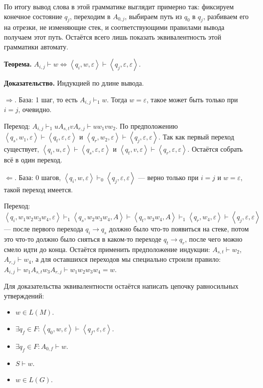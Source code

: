 По итогу вывод слова в этой грамматике выглядит примерно так: фиксируем конечное состояние $q_j$, переходим в $A_{0,j}$, выбираем путь из $q_0$ в $q_j$, разбиваем его на отрезки, не изменяющие стек, и соответствующими правилами вывода получаем этот путь.
Остаётся всего лишь показать эквивалентность этой грамматики автомату.

\textbf{Теорема.} $A_{i,j} \vdash w \iff \left<q_i, w, \varepsilon \right> \vdash \left<q_j, \varepsilon, \varepsilon \right>$.

\textbf{Доказательство.} Индукцией по длине вывода. 

$\Rightarrow$. База: 1 шаг, то есть $A_{i,j} \vdash_1 w$.
Тогда $w = \varepsilon$, такое может быть только при $i = j$, очевидно.

Переход: $A_{i,j} \vdash_1 uA_{s,t} v A_{r,j} \vdash u w_1 v w_2$.
По предположению $\left<q_s, w_1, \varepsilon \right> \vdash \left<q_t, \varepsilon, \varepsilon \right>$ и $\left<q_r, w_2, \varepsilon \right> \vdash \left<q_j, \varepsilon, \varepsilon \right>$.
Так как первый переход существует, $\left<q_i, u, \varepsilon \right> \vdash \left<q_s, \varepsilon, \varepsilon \right>$ и $\left<q_t, v, \varepsilon \right> \vdash \left<q_r, \varepsilon, \varepsilon \right>$.
Остаётся собрать всё в один переход.

$\Leftarrow$. База: 0 шагов, $\left<q_i, w, \varepsilon \right> \vdash_0 \left<q_j, \varepsilon, \varepsilon \right>$ --- верно только при $i = j$ и $w = \varepsilon$, такой переход имеется.

Переход: $\left<q_i, w_1 w_2 w_3 w_4, \varepsilon \right> \vdash_1 \left<q_s, w_2 w_3 w_4, A \right> \vdash \left<q_t, w_3 w_4, A \right> \vdash_1 \left<q_r, w_4, \varepsilon \right> \vdash \left<q_j, \varepsilon, \varepsilon \right>$ --- после первого перехода $q_i \to q_s$ должно было что-то появиться на стеке, потом это что-то должно было сняться в каком-то переходе $q_t \to q_r$, после чего можно смело идти до конца.
Остаётся применить предположение индукции: $A_{s,t} \vdash w_2$, $A_{r, j} \vdash w_4$, а для оставшихся переходов мы специально строили правило: $A_{i,j} \vdash w_1 A_{s,t} w_3 A_{r,j} \vdash w_1 w_2 w_3 w_4 = w$.

\QED

Для доказательства эквивалентности остаётся написать цепочку равносильных утверждений:
\begin{itemize}
    \item $w \in L(M)$.
    \item $\exists q_f \in F: \left<q_0, w, \varepsilon \right> \vdash \left<q_f, \varepsilon, \varepsilon \right>$.
    \item $\exists q_f \in F: A_{0,f} \vdash w$.
    \item $S \vdash w$.
    \item $w \in L(G)$.
\end{itemize}


